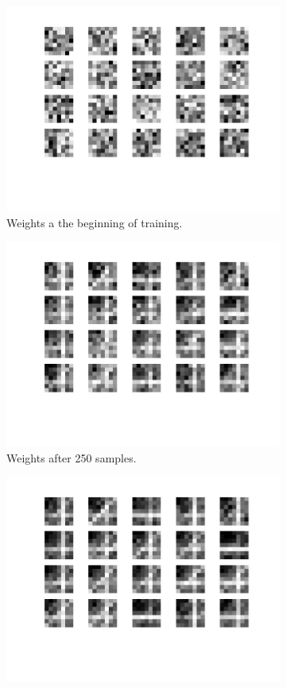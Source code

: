 \begin{figure}[h!]
	\centering
	\begin{subfigure}[t]{.45\textwidth}
  		\centering
  		\includegraphics[width=.9\linewidth]{imgs/7x7/w1.png}
  		\caption{Weights a the beginning of training.}
  		\label{fig:sub1}
	\end{subfigure}%
	\begin{subfigure}[t]{.45\textwidth}
  		\centering
  		\includegraphics[width=.9\linewidth]{imgs/7x7/w2.png}
  		\caption{Weights after 250 samples.}
  		\label{fig:sub2}
	\end{subfigure}
	\begin{subfigure}[t]{.45\textwidth}
  		\centering
  		\includegraphics[width=.9\linewidth]{imgs/7x7/w3.png}

\end{subfigure}
\end{figure}
